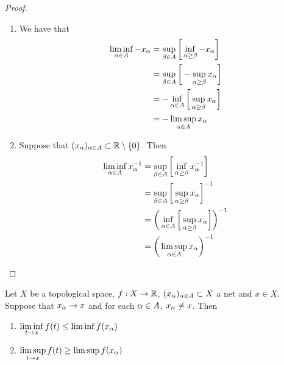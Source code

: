 \documentclass{book}
\begin{document}
	\begin{proof}\
		\begin{enumerate}
			\item We have that
			\begin{align*}
				\liminf_{\alpha \in A} - x_{\alpha}
				& = \sup_{\beta \in A} \bigg[ \inf_{\alpha \geq \beta} - x_{\alpha} \bigg] \\
				& =  \sup_{\beta \in A} \bigg[ - \sup_{\alpha \geq \beta}  x_{\alpha} \bigg] \\
				& = - \inf_{\alpha \in A } \bigg[ \sup_{\alpha \geq \beta} x_{\alpha} \bigg] \\
				& = - \limsup_{\alpha \in A} x_{\alpha}
			\end{align*}
			\item Suppose that $(x_{\alpha})_{\alpha \in A} \subset \mathbb{R} \setminus \{0\}$. Then 
			\begin{align*}
				\liminf_{\alpha \in A}  x_{\alpha}^{-1}
				& = \sup_{\beta \in A} \bigg[ \inf_{\alpha \geq \beta}  x_{\alpha}^{-1} \bigg] \\
				& =  \sup_{\beta \in A} \bigg[ \sup_{\alpha \geq \beta}  x_{\alpha} \bigg]^{-1} \\
				& =  \bigg( \inf_{\alpha \in A } \bigg[ \sup_{\alpha \geq \beta}  x_{\alpha} \bigg] \bigg)^{-1} \\
				& =  \bigg( \limsup_{\alpha \in A} x_{\alpha} \bigg)^{-1}
			\end{align*}
		\end{enumerate}
	\end{proof}
	

	\begin{ex} 
		Let $X$ be a topological space, $f:X \rightarrow \mathbb{R}$, $(x_{\alpha})_{\alpha \in A} \subset X$ a net and $x \in X$. Suppose that $x_{\alpha} \rightarrow x$ and for each $\alpha \in A$, $x_{\alpha} \neq x$. Then 
		\begin{enumerate}
			\item $\liminf\limits_{t \rightarrow x} f(t) \leq \liminf f(x_{\alpha})$
			\item $\limsup\limits_{t \rightarrow x} f(t) \geq \limsup f(x_{\alpha})$
		\end{enumerate}
	\end{ex}
\end{document}

